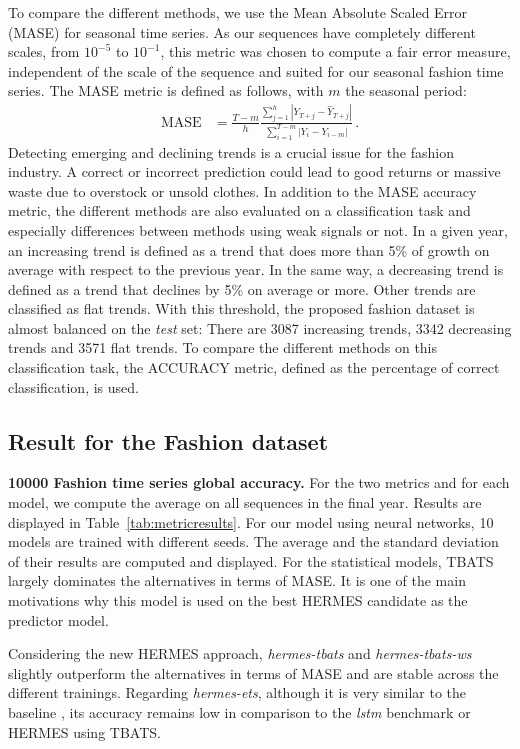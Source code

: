\documentclass[review]{elsarticle}
\begin{document}
To compare the different methods, we use the Mean Absolute Scaled Error (MASE) for seasonal time series. As our sequences have completely different scales, from $10^{-5}$ to $10^{-1}$, this metric was chosen to compute a fair error measure, independent of the scale of the sequence and suited for our seasonal fashion time series. The MASE metric is defined as follows, with $m$ the seasonal period:
\begin{align*}
\mathrm{MASE} &= \frac{T-m}{h}\frac{\sum_{j=1}^h |Y_{T+j} - \hat{Y}_{T+j}| }{\sum_{i=1}^{T-m} |Y_i - Y_{i-m}|}\,.
\end{align*}
Detecting emerging and declining trends is a crucial issue for the fashion industry. A correct or incorrect prediction could lead to good returns or massive waste due to overstock or unsold clothes. In addition to the MASE accuracy metric, the different methods are also evaluated on a classification task and especially differences between methods using weak signals or not. In a given year, an increasing trend is defined as a trend that does more than 5\% of growth on average with respect to the previous year. In the same way, a decreasing trend is defined as a trend that declines by 5\% on average or more. Other trends are classified as flat trends. With this threshold, the proposed fashion dataset is almost balanced on the {\em test} set: There are 3087 increasing trends, 3342 decreasing trends and 3571 flat trends. To compare the different methods on this classification task, the ACCURACY metric, defined as the percentage of correct classification, is used.


\subsection{Result for the Fashion dataset}

\textbf{10000 Fashion time series global accuracy. }For the two metrics and for each model, we compute the average on all sequences in the final year. Results are displayed in Table~\ref{tab:metricresults}. For our model using neural networks, 10 models are trained  with different seeds. The average and the standard deviation of their results are computed and displayed. For the statistical models, TBATS largely dominates the alternatives in terms of MASE. It is one of the main motivations why this model is used on the best HERMES candidate as the predictor model. 

Considering the new HERMES approach, \textit{hermes-tbats} and \textit{hermes-tbats-ws} slightly outperform the alternatives in terms of MASE and are stable across the different trainings. Regarding \textit{hermes-ets},   although it is very similar to the baseline \cite{smyl2020}, its accuracy remains low in comparison to the \textit{lstm} benchmark or HERMES using TBATS. 
\end{document}
